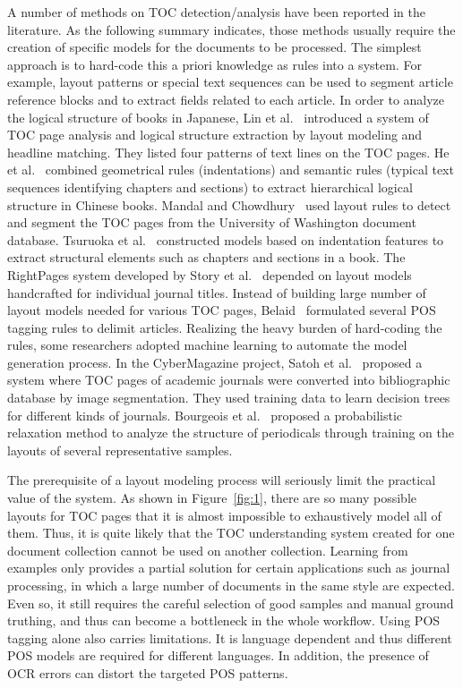 \documentclass[10pt]{article}
\begin{document}
A number of methods on TOC detection/analysis have been reported in the literature. As the following summary indicates, those methods usually require the creation of specific models for the documents to be processed. The simplest approach is to hard-code this a priori knowledge as rules into a system. For example, layout patterns or special text sequences can be used to segment article reference blocks and to extract fields related to each article. In order to analyze the logical structure of books in Japanese, Lin et al.~\cite{Lin1997} introduced a system of TOC page analysis and logical structure extraction by layout modeling and headline matching. They listed four patterns of text lines on the TOC pages. He et al.~\cite{He2004} combined geometrical rules (indentations) and semantic rules (typical text sequences identifying chapters and sections) to extract hierarchical logical structure in Chinese books. Mandal and Chowdhury~\cite{Mandal2003} used layout rules to detect and segment the TOC pages from the University of Washington document database. Tsuruoka et al.~\cite{Tsuruoka2001} constructed models based on indentation features to extract structural elements such as chapters and sections in a book. The RightPages system developed by Story et al.~\cite{Story1992} depended on layout models handcrafted for individual journal titles. Instead of building large number of layout models needed for various TOC pages, Belaid~\cite{Belaid2001} formulated several POS tagging rules to delimit articles. Realizing the heavy burden of hard-coding the rules, some researchers adopted machine learning to automate the model generation process. In the CyberMagazine project, Satoh et al.~\cite{Satoh1995} proposed a system where TOC pages of academic journals were converted into bibliographic database by image segmentation. They used training data to learn decision trees for different kinds of journals. Bourgeois et al.~\cite{Bourgeois2001} proposed a probabilistic relaxation method to analyze the structure of periodicals through training on the layouts of several representative samples.

The prerequisite of a layout modeling process will seriously limit the practical value of the system. As shown in Figure~\ref{fig:1}, there are so many possible layouts for TOC pages that it is almost impossible to exhaustively model all of them. Thus, it is quite likely that the TOC understanding system created for one document collection cannot be used on another collection. Learning from examples only provides a partial solution for certain applications such as journal processing, in which a large number of documents in the same style are expected. Even so, it still requires the careful selection of good samples and manual ground truthing, and thus can become a bottleneck in the whole workflow. Using POS tagging alone also carries limitations. It is language dependent and thus different POS models are required for different languages. In addition, the presence of OCR errors can distort the targeted POS patterns.
\end{document}
